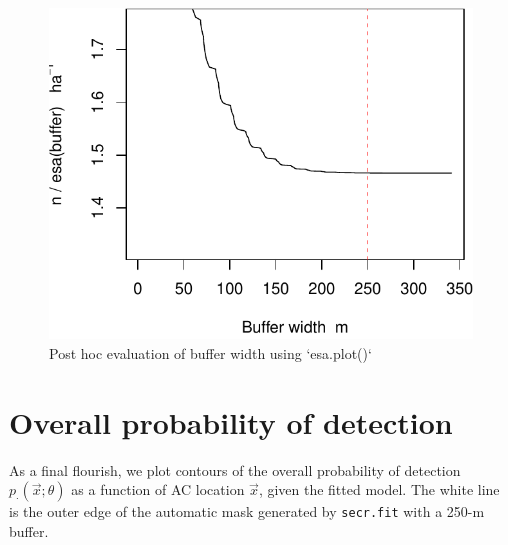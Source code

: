 \documentclass[
]{book}
\begin{document}
\begin{figure}

{\centering \includegraphics{SECRbook_files/figure-latex/esaplot-1} 

}

\caption{Post hoc evaluation of buffer width using `esa.plot()` }\label{fig:esaplot}
\end{figure}


\section{Overall probability of detection}\label{overall-probability-of-detection}

As a final flourish, we plot contours of the overall probability of detection \(p_\cdot(\vec x; \theta)\) as a function of AC location \(\vec x\), given the fitted model. The white line is the outer edge of the automatic mask generated by \texttt{secr.fit} with a 250-m buffer.
\end{document}
